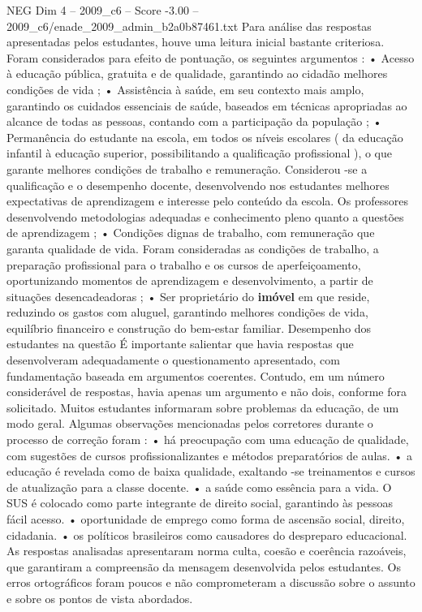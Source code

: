 \begin{textsample}{NEG Dim 4 – 2009\_c6 – Score -3.00 – 2009\_c6/enade\_2009\_admin\_b2a0b87461.txt}
Para análise das respostas apresentadas pelos estudantes, houve uma leitura inicial bastante criteriosa.
Foram considerados para efeito de pontuação, os seguintes argumentos : • Acesso à educação pública, gratuita e de qualidade, garantindo ao cidadão melhores condições de vida ; • Assistência à saúde, em seu contexto mais amplo, garantindo os cuidados essenciais de saúde, baseados em técnicas apropriadas ao alcance de todas as pessoas, contando com a participação da população ; • Permanência do estudante na escola, em todos os níveis escolares ( da educação infantil à educação superior, possibilitando a qualificação profissional ), o que garante melhores condições de trabalho e remuneração.
Considerou -se a qualificação e o desempenho docente, desenvolvendo nos estudantes melhores expectativas de aprendizagem e interesse pelo conteúdo da escola.
Os professores desenvolvendo metodologias adequadas e conhecimento pleno quanto a questões de aprendizagem ; • Condições dignas de trabalho, com remuneração que garanta qualidade de vida.
Foram consideradas as condições de trabalho, a preparação profissional para o trabalho e os cursos de aperfeiçoamento, oportunizando momentos de aprendizagem e desenvolvimento, a partir de situações desencadeadoras ; • Ser proprietário do \textbf{imóvel} em que reside, reduzindo os gastos com aluguel, garantindo melhores condições de vida, equilíbrio financeiro e construção do bem-estar familiar.
Desempenho dos estudantes na questão É importante salientar que havia respostas que desenvolveram adequadamente o questionamento apresentado, com fundamentação baseada em argumentos coerentes.
Contudo, em um número considerável de respostas, havia apenas um argumento e não dois, conforme fora solicitado.
Muitos estudantes informaram sobre problemas da educação, de um modo geral.
Algumas observações mencionadas pelos corretores durante o processo de correção foram : • há preocupação com uma educação de qualidade, com sugestões de cursos profissionalizantes e métodos preparatórios de aulas. • a educação é revelada como de baixa qualidade, exaltando -se treinamentos e cursos de atualização para a classe docente. • a saúde como essência para a vida.
O SUS é colocado como parte integrante de direito social, garantindo às pessoas fácil acesso. • oportunidade de emprego como forma de ascensão social, direito, cidadania. • os políticos brasileiros como causadores do despreparo educacional.
As respostas analisadas apresentaram norma culta, coesão e coerência razoáveis, que garantiram a compreensão da mensagem desenvolvida pelos estudantes.
Os erros ortográficos foram poucos e não comprometeram a discussão sobre o assunto e sobre os pontos de vista abordados.

\end{textsample}
